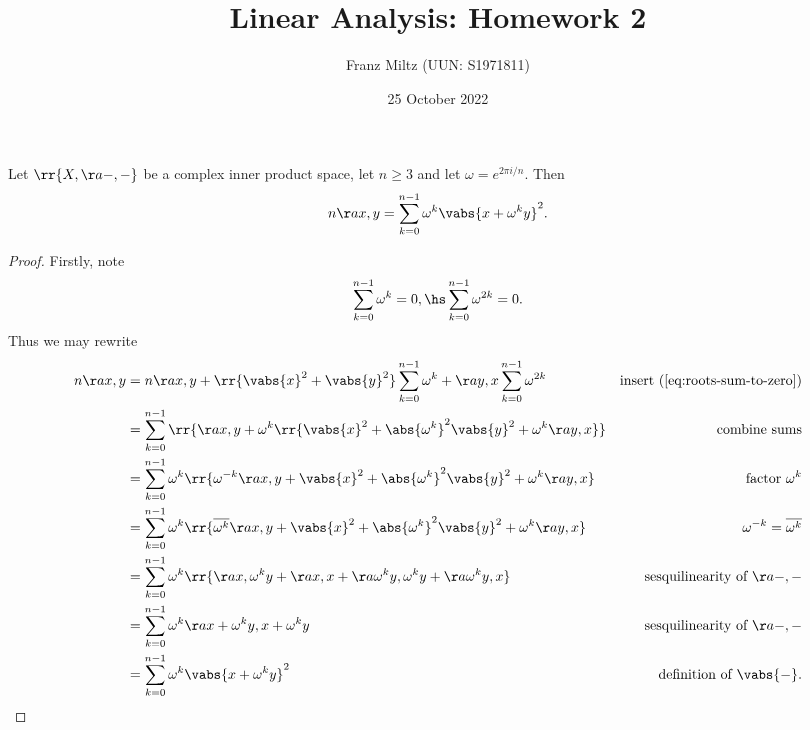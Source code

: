 \documentclass{article}
\begin{document}
\title{Linear Analysis: Homework 2}
\author{Franz Miltz (UUN: S1971811)}
\date{25 October 2022}

\maketitle

\begin{claim*}[2a]
  Let $\rr{X,\aa{-,-}}$ be a complex inner product space, let $n\geq 3$ and let
  $\omega=e^{2\pi i/n}$. Then
  \begin{align*}
    n\aa{x,y}=\sum_{k=0}^{n-1} \omega^k\vabs{x + \omega^ky}^2.
  \end{align*}
  \begin{proof}
    Firstly, note
    \begin{align}
      \label{eq:roots-sum-to-zero}
      \sum_{k=0}^{n-1} \omega^k = 0,\hs
      \sum_{k=0}^{n-1} \omega^{2k} = 0.
    \end{align}
    Thus we may rewrite
    \begin{align*}
      n\aa{x,y} &= n\aa{x,y} + \rr{\vabs{x}^2 + \vabs{y}^2} \sum_{k=0}^{n-1} \omega^k + \aa{y,x}\sum_{k=0}^{n-1} \omega^{2k} &\text{insert (\ref{eq:roots-sum-to-zero})}\\
                &= \sum_{k=0}^{n-1}\rr{\aa{x,y} + \omega^k \rr{\vabs{x}^2 + \abs{\omega^k}^2\vabs{y}^2 + \omega^k\aa{y,x}}} &\text{combine sums}\\
                & = \sum_{k=0}^{n-1}\omega^k \rr{\omega^{-k} \aa{x,y} + \vabs{x}^2 + \abs{\omega^k}^2\vabs{y}^2 + \omega^k\aa{y,x}} &\text{factor $\omega^k$}\\
                & = \sum_{k=0}^{n-1}\omega^k \rr{\overline{\omega^{k}} \aa{x,y} + \vabs{x}^2 + \abs{\omega^k}^2\vabs{y}^2 + \omega^k\aa{y,x}} &\text{$\omega^{-k}=\overline{\omega^k}$}\\
                & = \sum_{k=0}^{n-1}\omega^k \rr{\aa{x,\omega^k y}+\aa{x,x}+\aa{\omega^ky,\omega^ky}+\aa{\omega^k y, x}} &\text{sesquilinearity of $\aa{-,-}$}\\
                & = \sum_{k=0}^{n-1}\omega^k \aa{x+\omega^ky,x+\omega^ky} &\text{sesquilinearity of $\aa{-,-}$}\\
                & = \sum_{k=0}^{n-1} \omega^k \vabs{x+\omega^k y}^2 &\text{definition of $\vabs{-}$}.
    \end{align*}
  \end{proof}
\end{claim*}
\end{document}
